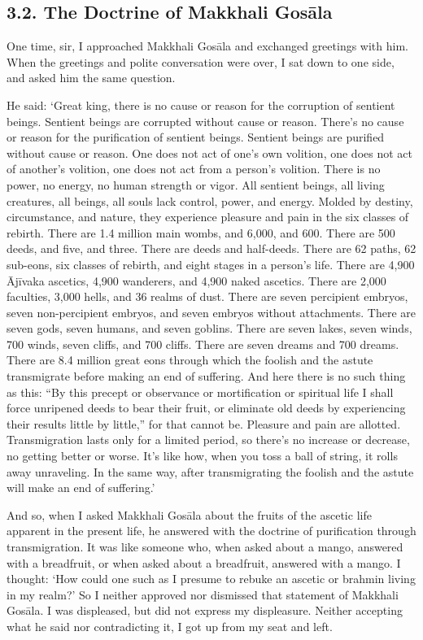 \documentclass[12pt,openany]{book}%
\begin{document}
\subsection*{3.2. The Doctrine of Makkhali \textsanskrit{Gosāla} }

One time, sir, I approached Makkhali \textsanskrit{Gosāla} and exchanged greetings with him. When the greetings and polite conversation were over, I sat down to one side, and asked him the same question. 

He said: ‘Great king, there is no cause or reason for the corruption of sentient beings. Sentient beings are corrupted without cause or reason. There’s no cause or reason for the purification of sentient beings. Sentient beings are purified without cause or reason. One does not act of one’s own volition, one does not act of another’s volition, one does not act from a person’s volition. There is no power, no energy, no human strength or vigor. All sentient beings, all living creatures, all beings, all souls lack control, power, and energy. Molded by destiny, circumstance, and nature, they experience pleasure and pain in the six classes of rebirth. There are 1.4 million main wombs, and 6,000, and 600. There are 500 deeds, and five, and three. There are deeds and half-deeds. There are 62 paths, 62 sub-eons, six classes of rebirth, and eight stages in a person’s life. There are 4,900 \textsanskrit{Ājīvaka} ascetics, 4,900 wanderers, and 4,900 naked ascetics. There are 2,000 faculties, 3,000 hells, and 36 realms of dust. There are seven percipient embryos, seven non-percipient embryos, and seven embryos without attachments. There are seven gods, seven humans, and seven goblins. There are seven lakes, seven winds, 700 winds, seven cliffs, and 700 cliffs. There are seven dreams and 700 dreams. There are 8.4 million great eons through which the foolish and the astute transmigrate before making an end of suffering. And here there is no such thing as this: “By this precept or observance or mortification or spiritual life I shall force unripened deeds to bear their fruit, or eliminate old deeds by experiencing their results little by little,” for that cannot be. Pleasure and pain are allotted. Transmigration lasts only for a limited period, so there’s no increase or decrease, no getting better or worse. It’s like how, when you toss a ball of string, it rolls away unraveling. In the same way, after transmigrating the foolish and the astute will make an end of suffering.’ 

And so, when I asked Makkhali \textsanskrit{Gosāla} about the fruits of the ascetic life apparent in the present life, he answered with the doctrine of purification through transmigration. It was like someone who, when asked about a mango, answered with a breadfruit, or when asked about a breadfruit, answered with a mango. I thought: ‘How could one such as I presume to rebuke an ascetic or brahmin living in my realm?’ So I neither approved nor dismissed that statement of Makkhali \textsanskrit{Gosāla}. I was displeased, but did not express my displeasure. Neither accepting what he said nor contradicting it, I got up from my seat and left. 
\end{document}
